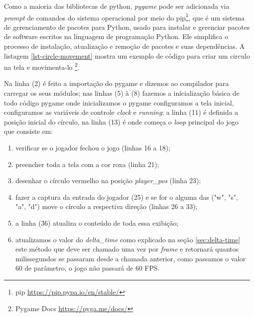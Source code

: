 Como a maioria das bibliotecas de python, \textit{pygame} pode ser adicionada via \textit{prompt} de comandos do sistema operacional  por meio do pip\footnote{pip \url{https://pip.pypa.io/en/stable/}}, que é um sistema de gerenciamento de pacotes para Python, usado para instalar e gerenciar pacotes de software escritos na linguagem de programação Python. Ele simplifica o processo de instalação, atualização e remoção de pacotes e suas dependências. A listagem \ref{lst-circle-movement} mostra um exemplo de código para criar um circulo na tela e movimenta-lo \footnote{Pygame Docs \url{https://pyga.me/docs/}}. 

\newpage

Na linha (2) é feito a importação do pygame e dizemos ao compilador para carregar os seus módulos; nas linhas (5) à (8) fazemos a inicialização básica de todo código pygame onde inicializamos o pygame configuramos a tela inicial, configuramos as variáveis de controle \textit{clock} e \textit{running}; a linha (11) é definida a posição inicial do círculo, na linha (13) é onde começa o \textit{loop} principal do jogo que consiste em:
\begin{enumerate}
    \item verificar se o jogador fechou o jogo (linhas 16 a 18);
    \item preencher toda a tela com a cor roxa (linha 21);
    \item desenhar o círculo vermelho na posição \textit{player\_pos} (linha 23);
    \item fazer a captura da entrada do jogador (25) e se for o alguma das ("w", "s", "a", "d") move o círculo a respectiva direção (linhas 26 a 33);
    \item a linha (36) atualiza o conteúdo de toda essa exibição;
    \item atualizamos o valor do \textit{delta\_time} como explicado na seção \ref{sec:delta-time} este método que deve ser chamado uma vez por \textit{frame} e retornará quantos milissegundos se passaram desde a chamada anterior, como passamos o valor 60 de parâmetro, o jogo não passará de 60 FPS.
\end{enumerate}








